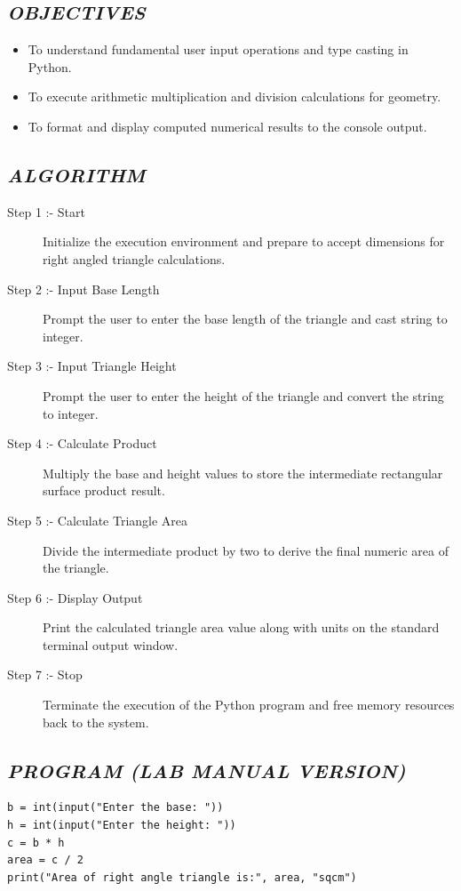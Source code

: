 \documentclass[11pt,a4paper]{article}
\begin{document}
\subsection*{\textit{OBJECTIVES}}
\begin{itemize}
  \item To understand fundamental user input operations and type casting in Python.
  \item To execute arithmetic multiplication and division calculations for geometry.
  \item To format and display computed numerical results to the console output.
\end{itemize}

\subsection*{\textit{ALGORITHM}}
\begin{description}
  \item[Step 1 :- Start] Initialize the execution environment and prepare to accept dimensions for right angled triangle calculations.
  \item[Step 2 :- Input Base Length] Prompt the user to enter the base length of the triangle and cast string to integer.
  \item[Step 3 :- Input Triangle Height] Prompt the user to enter the height of the triangle and convert the string to integer.
  \item[Step 4 :- Calculate Product] Multiply the base and height values to store the intermediate rectangular surface product result.
  \item[Step 5 :- Calculate Triangle Area] Divide the intermediate product by two to derive the final numeric area of the triangle.
  \item[Step 6 :- Display Output] Print the calculated triangle area value along with units on the standard terminal output window.
  \item[Step 7 :- Stop] Terminate the execution of the Python program and free memory resources back to the system.
\end{description}

\subsection*{\textit{PROGRAM (LAB MANUAL VERSION)}}
\begin{lstlisting}[style=pythonstyle]
b = int(input("Enter the base: ")) 
h = int(input("Enter the height: ")) 
c = b * h 
area = c / 2 
print("Area of right angle triangle is:", area, "sqcm")
\end{lstlisting}
\end{document}
